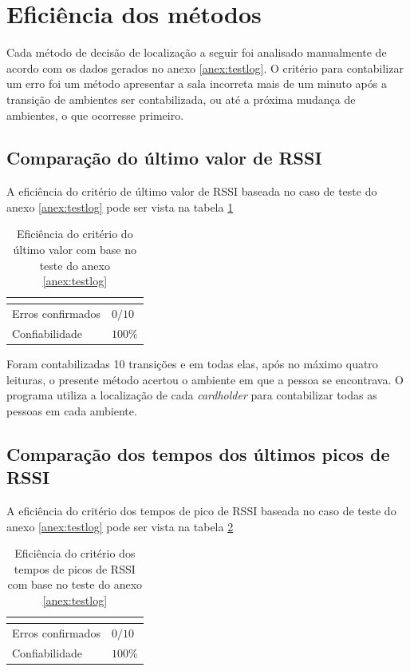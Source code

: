 \section{Eficiência dos métodos}

Cada método de decisão de localização a seguir foi analisado manualmente de acordo com os dados gerados no anexo \ref{anex:testlog}. O critério para contabilizar um erro foi um método apresentar a sala incorreta mais de um minuto após a transição de ambientes ser contabilizada, ou até a próxima mudança de ambientes, o que ocorresse primeiro.

\subsection{Comparação do último valor de RSSI} \label{section:ultimovalorRES}

A eficiência do critério de último valor de RSSI baseada no caso de teste do anexo \ref{anex:testlog} pode ser vista na tabela \ref{tab:resultados1}

\begin{table}[H]
\centering
\caption{Eficiência do critério do último valor com base no teste do anexo \ref{anex:testlog} }
\label{tab:resultados1}
\begin{tabular}{p{5cm} p{5cm}}
\hline
\multicolumn{2}{c}{\cellcolor{lightgray}{Eficiência do critério: Último valor de RSSI}} \\ \hline
Erros confirmados          &  $0 /10$        \\
Confiabilidade & $100\%$ \\ \hline
\end{tabular}
\end{table}

Foram contabilizadas 10 transições e em todas elas, após no máximo quatro leituras, o presente método acertou o ambiente em que a pessoa se encontrava. O programa utiliza a localização de cada \textit{cardholder} para contabilizar todas as pessoas em cada ambiente.


\subsection{Comparação dos tempos dos últimos picos de RSSI} \label{setion:resultRSSIpeak}

A eficiência do critério dos tempos de pico de RSSI baseada no caso de teste do anexo \ref{anex:testlog} pode ser vista na tabela \ref{tab:resultados2}

\begin{table}[H]
\centering
\caption{Eficiência do critério dos tempos de picos de RSSI com base no teste do anexo \ref{anex:testlog} }
\label{tab:resultados2}
\begin{tabular}{p{5cm} p{5cm}}
\hline
\multicolumn{2}{c}{\cellcolor{lightgray}{Eficiência do critério: Tempos de pico de RSSI}} \\ \hline
Erros confirmados          &  $0 / 10$        \\
Confiabilidade & $100\%$ \\ \hline
\end{tabular}
\end{table}

